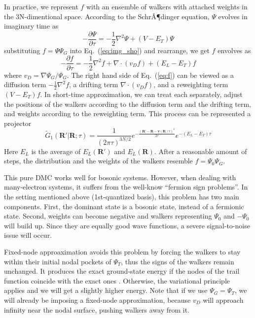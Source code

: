 \documentclass[%
reprint,
nofootinbib,
amsmath,amssymb,
aps,
prl,
]{revtex4-1}
\begin{document}
In practice, we represent $f$ with an ensemble of walkers with attached weights in the 3N-dimentional space.
According to the SchrÃ¶dinger equation, $\Psi$ evolves in imaginary time as
\begin{equation}
\label{eq:img_sho}
-\frac{\partial \Psi}{\partial \tau} = -\frac{1}{2}\nabla^2\Psi+(V-E_T)\Psi
\end{equation}
%
substituting $f=\Psi\Psi_G$ into Eq.~(\ref{eq:img_sho}) and rearrange, we get $f$ envolves as
\begin{equation}
\label{eq:f}
-\frac{\partial f}{\partial \tau} = -\frac{1}{2}\nabla^2f+\nabla\cdot(v_Df)+(E_L-E_T)f
\end{equation}
where $v_D = \nabla\Psi_G/\Psi_G$.
The right hand side of Eq.~(\ref{eq:f}) can be viewed as a diffusion term $-\frac{1}{2}\nabla^2f$, a drifting term $\nabla\cdot(v_Df)$, and a reweighting term $(V-E_T)f$.
In short-time approximation, we can treat each separately, adjust the positions of the walkers according to the diffusion term and the drifting term, and weights according to the reweighting term.
This process can be represented a projector
\begin{equation}
\label{eq:G1t}
\widetilde{G}_1(\bm{R'}|\bm{R};\tau)
= \frac{1}{(2\pi\tau)^{3N/2}} e^{-\frac{(\bm{R'}-\bm{R}-\bm{v}(\bm{R})\tau)^2}{2\tau}} e^{-\left(E_L-E_T\right)\tau}
\end{equation}
Here $E_L$ is the average of $E_L(\bm{R'})$ and $E_L(\bm{R})$.
After a reasonable amount of steps, the distribution and the weights of the walkers resemble $f=\Psi_0\Psi_G$.

This pure DMC works well for bosonic systems.
However, when dealing with many-electron systems, it suffers from the well-know ``fermion sign problems''.
In the setting mentioned above (1st-quantized basis), this problem has two main components.
First, the dominant state is a bosonic state, instead of a fermionic state.
Second, weights can become negative and walkers representing $\Psi_0$ and $-\Psi_0$ will build up. Since they are equally good wave functions, a severe signal-to-noise issue will occur.

Fixed-node approaximation avoids this problem by forcing the walkers to stay within their initial nodal pockets of $\Psi_T$, thus the signs of the walkers remain unchanged.
It produces the exact ground-state energy if the nodes of the trail function coincide with the exact ones \cite{reynolds1982fixed}.
Otherwise, the variational principle applies and we will get a slightly higher energy.
Note that if we use $\Psi_G = \Psi_T$, we will already be imposing a fixed-node approximation, because $v_D$ will approach infinity near the nodal surface, pushing walkers away from it.
\end{document}

